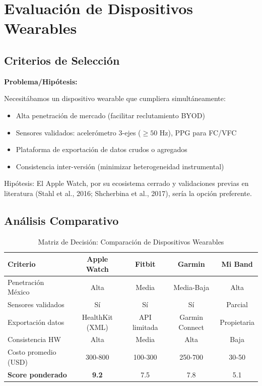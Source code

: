 \documentclass[12pt,letterpaper,twoside]{report}
\begin{document}
\section{Evaluación de Dispositivos Wearables}

\subsection{Criterios de Selección}

\begin{hipotesisbox}
\textbf{Problema/Hipótesis:}

Necesitábamos un dispositivo wearable que cumpliera simultáneamente:
\begin{itemize}[noitemsep]
    \item Alta penetración de mercado (facilitar reclutamiento BYOD)
    \item Sensores validados: acelerómetro 3-ejes ($\geq 50$ Hz), PPG para FC/VFC
    \item Plataforma de exportación de datos crudos o agregados
    \item Consistencia inter-versión (minimizar heterogeneidad instrumental)
\end{itemize}

Hipótesis: El Apple Watch, por su ecosistema cerrado y validaciones previas en literatura (Stahl et al., 2016; Shcherbina et al., 2017), sería la opción preferente.
\end{hipotesisbox}

\subsection{Análisis Comparativo}

\begin{table}[H]
\centering
\caption{Matriz de Decisión: Comparación de Dispositivos Wearables}
\label{tab:wearables_comparison}
\begin{tabular}{@{}lcccc@{}}
\toprule
\textbf{Criterio} & \textbf{Apple Watch} & \textbf{Fitbit} & \textbf{Garmin} & \textbf{Mi Band} \\
\midrule
Penetración México & Alta & Media & Media-Baja & Alta \\
Sensores validados & Sí & Sí & Sí & Parcial \\
Exportación datos & HealthKit (XML) & API limitada & Garmin Connect & Propietaria \\
Consistencia HW & Alta & Media & Alta & Baja \\
Costo promedio (USD) & 300-800 & 100-300 & 250-700 & 30-50 \\
\textbf{Score ponderado} & \textbf{9.2} & 7.5 & 7.8 & 5.1 \\
\bottomrule
\end{tabular}
\end{table}
\end{document}
